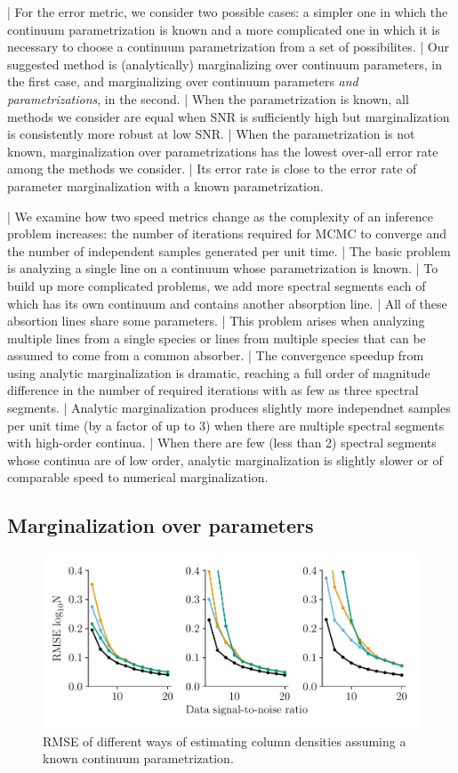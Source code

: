 \documentclass[manuscript]{aastex62}
\begin{document}
| For the error metric, we consider two possible cases: a simpler one in which the continuum parametrization is known and a more complicated one in which it is necessary to choose a continuum parametrization from a set of possibilites.
| Our suggested method is (analytically) marginalizing over continuum parameters, in the first case, and marginalizing over continuum parameters \emph{and parametrizations}, in the second.
| When the parametrization is known, all methods we consider are equal when SNR is sufficiently high but marginalization is consistently more robust at low SNR.
| When the parametrization is not known, marginalization over parametrizations has the lowest over-all error rate among the methods we consider.
| Its error rate is close to the error rate of parameter marginalization with a known parametrization.

| We examine how two speed metrics change as the complexity of an inference problem increases: the number of iterations required for MCMC to converge and the number of independent samples generated per unit time.
| The basic problem is analyzing a single line on a continuum whose parametrization is known.
| To build up more complicated problems, we add more spectral segments each of which has its own continuum and contains another absorption line.
| All of these absortion lines share some parameters.
| This problem arises when analyzing multiple lines from a single species or lines from multiple species that can be assumed to come from a common absorber.
| The convergence speedup from using analytic marginalization is dramatic, reaching a full order of magnitude difference in the number of required iterations with as few as three spectral segments.
| Analytic marginalization produces slightly more independnet samples per unit time (by a factor of up to 3) when there are multiple spectral segments with high-order continua.
| When there are few (less than 2) spectral segments whose continua are of low order, analytic marginalization is slightly slower or of comparable speed to numerical marginalization.

\subsection{Marginalization over parameters}
\begin{figure}
  \includegraphics[width=\linewidth]{figures/marginalized_unmarginalized_labeled.pdf}
  \caption{RMSE of different ways of estimating column densities assuming a known continuum parametrization.}
  \label{fig:order-known-comparison}
\end{figure}
\end{document}
